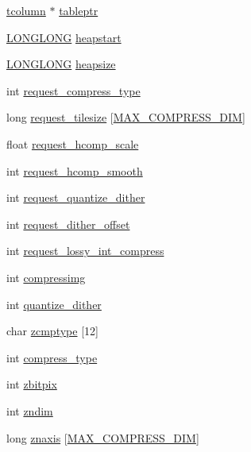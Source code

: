 \begin{DoxyCompactItemize}
\item 
\hyperlink{structtcolumn}{tcolumn} $\ast$ \hyperlink{struct_f_i_t_sfile_a148b23fb49f5f98d65ec4520ddf9a25a}{tableptr}
\item 
\hyperlink{cfortran_8h_af559a7ae68520d96f21d0655d6792508}{L\+O\+N\+G\+L\+O\+NG} \hyperlink{struct_f_i_t_sfile_a7ecc354485a39a196e29532b234f5937}{heapstart}
\item 
\hyperlink{cfortran_8h_af559a7ae68520d96f21d0655d6792508}{L\+O\+N\+G\+L\+O\+NG} \hyperlink{struct_f_i_t_sfile_afe2a52931894c5f8dd51d6590d8ffefb}{heapsize}
\item 
int \hyperlink{struct_f_i_t_sfile_a05cdbe338c295cfccbda8a34dacaa626}{request\+\_\+compress\+\_\+type}
\item 
long \hyperlink{struct_f_i_t_sfile_a5ca8df72baf3d0c126dc3a58c305a2fc}{request\+\_\+tilesize} \mbox{[}\hyperlink{fitsio_8h_a490098c3c66339cb8e66ec352707f0d4}{M\+A\+X\+\_\+\+C\+O\+M\+P\+R\+E\+S\+S\+\_\+\+D\+IM}\mbox{]}
\item 
float \hyperlink{struct_f_i_t_sfile_aedc0a11b1f2b453567229922a62aef12}{request\+\_\+hcomp\+\_\+scale}
\item 
int \hyperlink{struct_f_i_t_sfile_a566ffdc1c8e3eb42dc0d9e70756e1857}{request\+\_\+hcomp\+\_\+smooth}
\item 
int \hyperlink{struct_f_i_t_sfile_adc4c6b158913e8c96ace81fc7ceeeade}{request\+\_\+quantize\+\_\+dither}
\item 
int \hyperlink{struct_f_i_t_sfile_a353aeb27ce5ee436088402da906a7b27}{request\+\_\+dither\+\_\+offset}
\item 
int \hyperlink{struct_f_i_t_sfile_a1db55901960960dd7ae34624b4190403}{request\+\_\+lossy\+\_\+int\+\_\+compress}
\item 
int \hyperlink{struct_f_i_t_sfile_a97751cec2917a8f0874669c32a9d8630}{compressimg}
\item 
int \hyperlink{struct_f_i_t_sfile_a3d728a4c9208d7c8271a53c915e58459}{quantize\+\_\+dither}
\item 
char \hyperlink{struct_f_i_t_sfile_ac92c9317d1d82f359e79f8de7771e2eb}{zcmptype} \mbox{[}12\mbox{]}
\item 
int \hyperlink{struct_f_i_t_sfile_a98181d2bf6beb4ab5dcaa216616ad125}{compress\+\_\+type}
\item 
int \hyperlink{struct_f_i_t_sfile_ab8fb8b9de7b4fd3d89d0e5804e5ad333}{zbitpix}
\item 
int \hyperlink{struct_f_i_t_sfile_a5ff648277ce3a2220a533ea37c2b785f}{zndim}
\item 
long \hyperlink{struct_f_i_t_sfile_a2fbc3725f6ab03767010a3ff1a5cfdaa}{znaxis} \mbox{[}\hyperlink{fitsio_8h_a490098c3c66339cb8e66ec352707f0d4}{M\+A\+X\+\_\+\+C\+O\+M\+P\+R\+E\+S\+S\+\_\+\+D\+IM}\mbox{]}

\end{DoxyCompactItemize}

